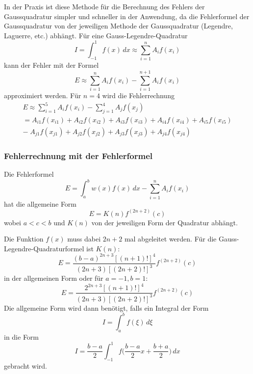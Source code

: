 In der Praxis ist diese Methode für die Berechnung des Fehlers der Gaussquadratur
simpler und schneller in der Anwendung, da die Fehlerformel der Gaussquadratur
von der jeweiligen Methode der Gaussquadratur (Legendre, Laguerre, etc.) abhängt.
Für eine Gauss-Legendre-Quadratur 
\begin{equation}
    I 
    = 
    \int_{-1}^{1}f(x)\,dx 
    \approx 
    \sum_{i=1}^{n}A_{i}f(x_{i})
\end{equation}
kann der Fehler mit der Formel
\begin{equation}
    E 
    \approx 
    \sum_{i=1}^{n}A_{i}f(x_{i})
    -
    \sum_{i=1}^{n+1}A_{i}f(x_{i})
\end{equation}
approximiert werden. Für $n = 4$ wird die Fehlerrechnung 
\begin{gather*}
    E
    \approx
    \sum_{i=1}^{5}A_{i}f(x_{i})
    -
    \sum_{j=1}^{4}A_{j}f(x_{j}) \\
    =
    A_{i1}f(x_{i1})+A_{i2}f(x_{i2})+A_{i3}f(x_{i3})+A_{i4}f(x_{i4})+A_{i5}f(x_{i5}) \\
    -\;
    A_{j1}f(x_{j1})+A_{j2}f(x_{j2})+A_{j3}f(x_{j3})+A_{j4}f(x_{j4})
\end{gather*}

\subsubsection{Fehlerrechnung mit der Fehlerformel}
Die Fehlerformel
\begin{equation}
    E = \int_{a}^{b} w(x) f(x) \, dx - \sum_{i=1}^{n}A_{i}f(x_{i})    
\end{equation} 
hat die allgemeine Form
\begin{equation}
    E = K(n)f^{(2n+2)}(c)
\end{equation}
wobei $a<c<b$ und $K(n)$ von der jeweiligen Form der Quadratur abhängt.

Die Funktion $f(x)$ muss dabei $2n+2$ mal abgeleitet werden.
Für die Gauss-Legendre-Quadraturformel ist $K(n)$:
\begin{equation}
    \label{quadratur:equation:errorformula}
    E = \frac{(b-a)^{2n+3}[(n+1)!]^{4}}{(2n+3)[(2n+2)!]^{3}}f^{(2n+2)}(c)
\end{equation}
in der allgemeinen Form oder für $a=-1, b=1$:
\begin{equation}
    E = \frac{2^{2n+3}[(n+1)!]^{4}}{(2n+3)[(2n+2)!]^{3}}f^{(2n+2)}(c)
\end{equation}
Die allgemeine Form wird dann benötigt, falls ein Integral der Form 
\begin{equation}
    I = \int_{a}^{b} f(\xi) \,d\xi
\end{equation}
in die Form
\begin{equation}
    I = \frac{b-a}{2} \int_{-1}^{1} f\bigg(\frac{b-a}{2}x + \frac{b+a}{2}\bigg) \,dx
\end{equation}
gebracht wird.


